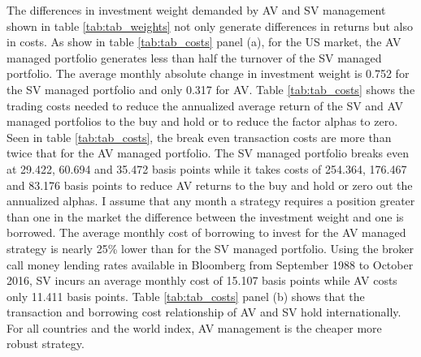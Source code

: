 The differences in investment weight demanded by AV and SV management shown in table \ref{tab:tab_weights} not only generate differences in returns but also in costs. As show in table \ref{tab:tab_costs} panel (a), for the US market, the AV managed portfolio generates less than half the turnover of the SV managed portfolio. The average monthly absolute change in investment weight is 0.752 for the SV managed portfolio and only 0.317 for AV. Table \ref{tab:tab_costs} shows the trading costs needed to reduce the annualized average return of the SV and AV managed portfolios to the buy and hold or to reduce the factor alphas to zero. \citep{frazzini_trading_2015,moreira_volatility-managed_2017} Seen in table \ref{tab:tab_costs}, the break even transaction costs are more than twice that for the AV managed portfolio. The SV managed portfolio breaks even at 29.422, 60.694 and 35.472 basis points while it takes costs of 254.364, 176.467 and 83.176 basis points to reduce AV returns to the buy and hold or zero out the annualized alphas. %
I assume that any month a strategy requires a position greater than one in the market the difference between the investment weight and one is borrowed. The average monthly cost of borrowing to invest for the AV managed strategy is nearly 25\% lower than for the SV managed portfolio. Using the broker call money lending rates available in Bloomberg from September 1988 to October 2016, SV incurs an average monthly cost of 15.107 basis points while AV costs only 11.411 basis points. %
Table \ref{tab:tab_costs} panel (b) shows that the transaction and borrowing cost relationship of AV and SV hold internationally. For all countries and the world index, AV management is the cheaper more robust strategy.